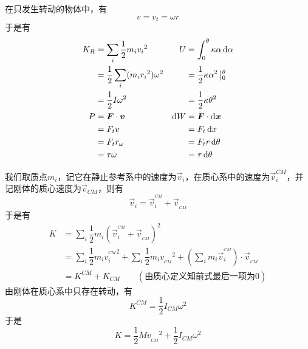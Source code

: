 \begin{prove}
    在只发生转动的物体中，有\[v=v_t=\omega r\]于是有
    \begin{align*}
        K_R & =\sum_i\dfrac{1}{2}m_iv_i{}^2            & U      & =\int_0^{\theta}\kappa\alpha\dif\alpha              \\
            & =\dfrac{1}{2}\sum_i(m_i r_i{}^2)\omega^2 &        & =\dfrac{1}{2}\kappa\alpha^2\left|_0^{\theta}\right. \\
            & =\dfrac{1}{2}I\omega^2                   &        & =\dfrac{1}{2}\kappa\theta^2                         \\
        P   & =\vec{F}\cdot \vec{v}                    & \dif W & =\vec{F}\cdot\dif \vec{x}                           \\
            & =F_tv                                    &        & =F_t\dif x                                          \\
            & =F_tr_\omega                             &        & =F_tr\dif\theta                                     \\
            & =\tau\omega                              &        & =\tau\dif\theta
    \end{align*}
\end{prove}
\begin{prove}[\itr{Konig's Theorem}{柯尼希定理}\qquad$K=K_{CM}+K^{CM}$]
    我们取质点$m_i$，记它在静止参考系中的速度为$\vec{v}_i$，在质心系中的速度为$\vec{v}^{CM}_i$，并记刚体的质心速度为$\vec{v}_{CM}$，则有
    \[\vec{v}_i=\vec{v}_i^{^{CM}}+\vec{v}_{_{CM}}\]
    于是有
    \begin{align*}
        K & =\sum_i\dfrac{1}{2}m_i(\vec{v}_i^{^{CM}}+\vec{v}_{_{CM}})^2                                                               \\
          & =\sum_i\dfrac{1}{2}m_i{v_i^{^{CM}}}^2+\sum_i\dfrac{1}{2}m_i{v_{_{CM}}}^2+(\sum_im_i\vec{v}_i^{^{CM}})\cdot\vec{v}_{_{CM}} \\
          & =K^{CM}+K_{CM}\qquad(\text{由质心定义知前式最后一项为0})
    \end{align*}
    由刚体在质心系中只存在转动，有
    \[K^{CM}=\dfrac{1}{2}I_{CM}\omega^2\]
    于是
    \[K=\dfrac{1}{2}M{v_{_{CM}}}^2+\dfrac{1}{2}I_{CM}\omega^2\]
\end{prove}
